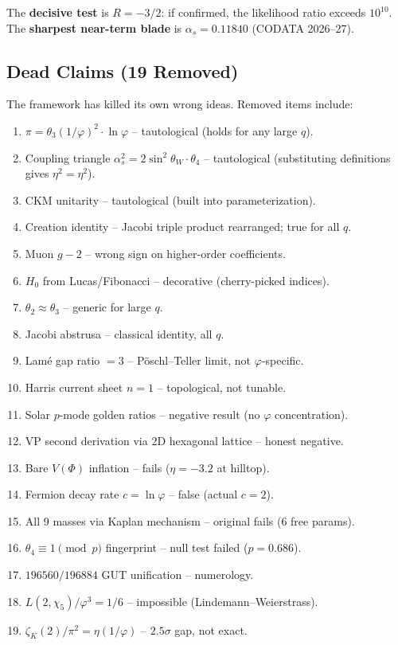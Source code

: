 \documentclass[11pt,a4paper]{article}
\newcommand{\vp}{\varphi}
\begin{document}
The \textbf{decisive test} is $R = -3/2$: if confirmed, the likelihood ratio
exceeds $10^{10}$.  The \textbf{sharpest near-term blade} is $\alpha_s = 0.11840$
(CODATA 2026--27).

\subsection{Dead Claims (19 Removed)}

The framework has killed its own wrong ideas.  Removed items include:

\begin{enumerate}[nosep]
\item $\pi = \theta_3(1/\vp)^2\cdot\ln\vp$ -- tautological (holds for any large $q$).
\item Coupling triangle $\alpha_s^2 = 2\sin^2\!\theta_W\cdot\theta_4$ -- tautological
      (substituting definitions gives $\eta^2 = \eta^2$).
\item CKM unitarity -- tautological (built into parameterization).
\item Creation identity -- Jacobi triple product rearranged; true for all $q$.
\item Muon $g-2$ -- wrong sign on higher-order coefficients.
\item $H_0$ from Lucas/Fibonacci -- decorative (cherry-picked indices).
\item $\theta_2 \approx \theta_3$ -- generic for large $q$.
\item Jacobi abstrusa -- classical identity, all $q$.
\item Lam\'e gap ratio $= 3$ -- P\"oschl--Teller limit, not $\vp$-specific.
\item Harris current sheet $n = 1$ -- topological, not tunable.
\item Solar $p$-mode golden ratios -- negative result (no $\vp$ concentration).
\item VP second derivation via 2D hexagonal lattice -- honest negative.
\item Bare $V(\Phi)$ inflation -- fails ($\eta = -3.2$ at hilltop).
\item Fermion decay rate $c = \ln\vp$ -- false (actual $c = 2$).
\item All 9 masses via Kaplan mechanism -- original fails (6 free params).
\item $\theta_4 \equiv 1\pmod{p}$ fingerprint -- null test failed ($p = 0.686$).
\item $196560/196884$ GUT unification -- numerology.
\item $L(2,\chi_5)/\vp^3 = 1/6$ -- impossible (Lindemann--Weierstrass).
\item $\zeta_K(2)/\pi^2 = \eta(1/\vp)$ -- $2.5\sigma$ gap, not exact.
\end{enumerate}
\end{document}
